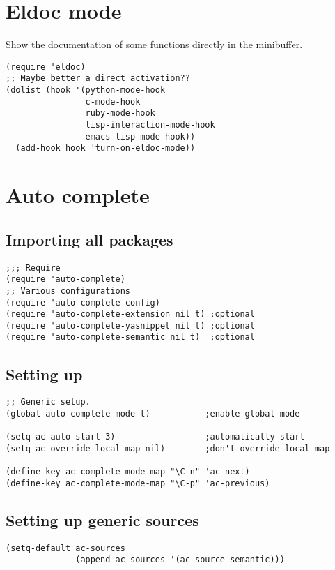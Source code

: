 \documentclass[11pt]{article}
\begin{document}
\section{Eldoc mode}
\label{sec-27}

  Show the documentation of some functions directly in the minibuffer.
\begin{verbatim}
(require 'eldoc)
;; Maybe better a direct activation??
(dolist (hook '(python-mode-hook
                c-mode-hook
                ruby-mode-hook
                lisp-interaction-mode-hook
                emacs-lisp-mode-hook))
  (add-hook hook 'turn-on-eldoc-mode))
\end{verbatim}
\section{Auto complete}
\label{sec-28}
\subsection{Importing all packages}
\label{sec-28.1}

\begin{verbatim}
;;; Require
(require 'auto-complete)
;; Various configurations
(require 'auto-complete-config)
(require 'auto-complete-extension nil t) ;optional
(require 'auto-complete-yasnippet nil t) ;optional
(require 'auto-complete-semantic nil t)  ;optional
\end{verbatim}
\subsection{Setting up}
\label{sec-28.2}

\begin{verbatim}
;; Generic setup.
(global-auto-complete-mode t)           ;enable global-mode

(setq ac-auto-start 3)                  ;automatically start
(setq ac-override-local-map nil)        ;don't override local map

(define-key ac-complete-mode-map "\C-n" 'ac-next)
(define-key ac-complete-mode-map "\C-p" 'ac-previous)
\end{verbatim}
\subsection{Setting up generic sources}
\label{sec-28.3}

\begin{verbatim}
(setq-default ac-sources
              (append ac-sources '(ac-source-semantic)))
\end{verbatim}
\end{document}
